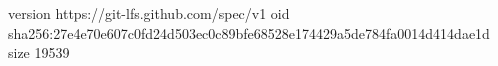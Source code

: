 version https://git-lfs.github.com/spec/v1
oid sha256:27e4e70e607c0fd24d503ec0c89bfe68528e174429a5de784fa0014d414dae1d
size 19539
